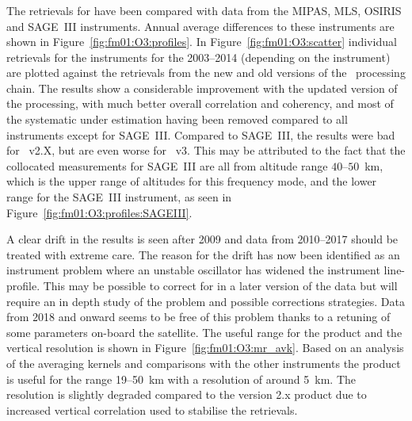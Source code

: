 \subsubsection{}
\label{sec:fm01:comparison:O3}
The retrievals for  have been compared with data from the MIPAS, MLS,
OSIRIS and SAGE~III instruments. Annual average differences to these
instruments are shown in Figure~\ref{fig:fm01:O3:profiles}. In
Figure~\ref{fig:fm01:O3:scatter} individual retrievals for the instruments for
the 2003--2014 (depending on the instrument)  are plotted against the
retrievals from the new and old versions of the \smr\ processing chain. The
results show a considerable improvement with the updated version of the
processing, with much better overall correlation and coherency, and most of the
systematic under estimation having been removed compared to all instruments
except for SAGE~III.  Compared to SAGE~III, the results were bad for \smr~v2.X,
but are even worse for \smr~v3. This may be attributed to the fact that the
collocated measurements for SAGE~III are all from altitude range $40$--$50$~km,
which is the upper range of altitudes for this frequency mode, and the lower
range for the SAGE~III instrument, as seen in
Figure~\ref{fig:fm01:O3:profiles:SAGEIII}.

A clear drift in the results is seen after 2009 and data from 2010--2017 should
be treated with extreme care. The reason for the  drift has now been identified
as an instrument problem where an unstable oscillator has widened the
instrument line-profile.  This may be possible to correct for in a later
version of the data but will require an in depth study of the problem and possible corrections strategies.  
Data from 2018 and onward seems to  be free of this problem
thanks to a retuning  of some parameters on-board the satellite.  The useful
range for the product and the vertical resolution is shown in
Figure~\ref{fig:fm01:O3:mr_avk}.  Based on an analysis of the averaging kernels and
comparisons with the other instruments the product is useful for the range 19--50~km
with a resolution of around 5~km. The resolution is slightly degraded compared
to the version 2.x product due to increased vertical correlation used to
stabilise the retrievals.


